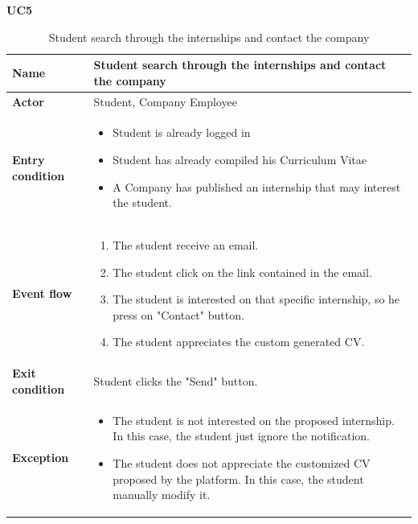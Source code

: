     \textbf{UC5}
    \begin{table}[H]
    \centering
    \begin{tabular}{|l|p{11.9cm}|}
        \hline
        \textbf{Name}            & Student search through the internships and contact the company \\\hline
        \textbf{Actor}           & Student, Company Employee         \\\hline
        \textbf{Entry condition} &
        \begin{itemize}
              \item Student is already logged in
              \item Student has already compiled his Curriculum Vitae
              \item A Company has published an internship that may interest the student.
        \end{itemize}                                        \\\hline
        \textbf{Event flow}      &
        \begin{enumerate}[label=\arabic*.]
              \item The student receive an email.
              \item The student click on the link contained in the email.
              \item The student is interested on that specific internship, so he press on "Contact" button.
              \item The student appreciates the custom generated CV.
        \end{enumerate}            \\\hline
        \textbf{Exit condition}  & Student clicks the "Send" button.\\\hline
        \textbf{Exception}       &  
        \begin{itemize}
            \item The student is not interested on the proposed internship. In this case, the student just ignore the notification.
            \item The student does not appreciate the customized CV proposed by the platform. In this case, the student manually modify it.
        \end{itemize} 
        \\\hline
    \end{tabular}
    \caption{Student search through the internships and contact the company}
    \label{table:Student search through the internhisps and contact the company}
    \end{table}
